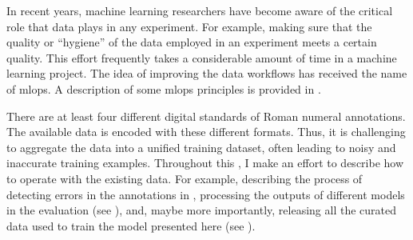

In recent years, machine learning researchers have become
aware of the critical role that data plays in any
experiment. For example, making sure that the quality or
``hygiene'' of the data employed in an experiment meets a
certain quality. This effort frequently takes a considerable
amount of time in a machine learning project. The idea of
improving the data workflows has received the name of
\gls{mlops}. A description of some \gls{mlops} principles is
provided in \textcite{renggli2021data}.

There are at least four different digital standards of Roman
numeral annotations. The available data is encoded with
these different formats. Thus, it is challenging to
aggregate the data into a unified training dataset, often
leading to noisy and inaccurate training examples.
Throughout this \thesisdiss{}, I make an effort to describe
how to operate with the existing data. For example,
describing the process of detecting errors in the
annotations in ,
processing the outputs of different models in the evaluation
(see ), and, maybe more
importantly, releasing all the curated data used to train
the model presented here (see ).
